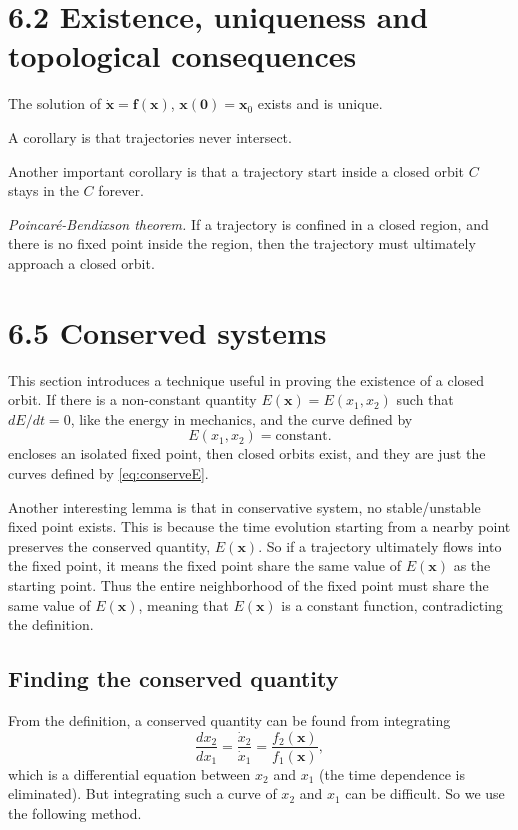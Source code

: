 \documentclass{book}
\begin{document}
\section{6.2 Existence, uniqueness and topological consequences}


The solution of $\mathbf{\dot x} = \mathbf f(\mathbf x)$,
$\mathbf x(\mathbf 0) = \mathbf x_0$ exists and is unique.

A corollary is that trajectories never intersect.

Another important corollary is that a trajectory start inside a closed orbit $C$ stays in the $C$ forever.

\emph{Poincar\'e-Bendixson theorem.}
If a trajectory is confined in a closed region, and there is no fixed point inside the region, then the trajectory must ultimately approach a closed orbit.


\section{6.5 Conserved systems}


This section introduces a technique useful
in proving the existence of a closed orbit.
%
If there is a non-constant quantity $E(\mathbf x) = E(x_1, x_2)$
such that $dE/dt = 0$, like the energy in mechanics,
and the curve defined by
\begin{equation}
E(x_1, x_2) = \mathrm{constant}.
\label{eq:conserveE}
\end{equation}
encloses an isolated fixed point,
then closed orbits exist,
and they are just the curves defined by \eqref{eq:conserveE}.



Another interesting lemma is that in conservative system,
no stable/unstable fixed point exists.
This is because the time evolution starting from
a nearby point preserves the conserved quantity, $E(\mathbf x)$.
So if a trajectory ultimately flows into the fixed point,
it means the fixed point share the same value of $E(\mathbf x)$
as the starting point.
Thus the entire neighborhood of the fixed point must
share the same value of $E(\mathbf x)$,
meaning that $E(\mathbf x)$ is a constant function,
contradicting the definition.


\subsection{Finding the conserved quantity}



From the definition, a conserved quantity can be found from integrating
\begin{equation}
\frac{dx_2}{dx_1}
=
\frac{\dot x_2}{\dot x_1}
=
\frac{f_2(\mathbf x)}{f_1(\mathbf x)},
\label{eq:conserved_trace}
\end{equation}
which is a differential equation between $x_2$ and $x_1$ (the time dependence is eliminated).
But integrating such a curve of $x_2$ and $x_1$ can be difficult.
So we use the following method.
\end{document}
